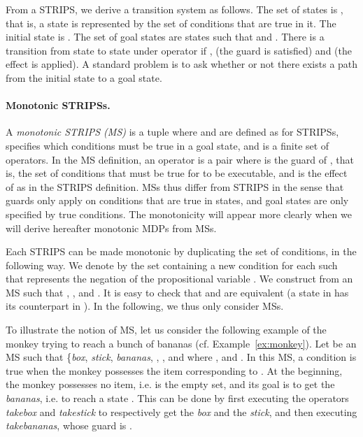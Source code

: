 \noindent From a STRIPS, we derive a transition system as follows. The set of states is , that is, a state is represented by the set of conditions that are true in it. The initial state is . The set of goal states are states  such that  and . There is a transition from state  to state  under operator  if ,  (the guard is satisfied) and  (the effect is applied). A standard problem is to ask whether or not there exists a path from the initial state to a goal state.

\paragraph{Monotonic STRIPSs.} 
A \textit{monotonic STRIPS (MS)} is a tuple  where  and  are defined as for STRIPSs,  specifies which conditions must be true in a goal state, and  is a finite set of operators. In the MS definition, an operator  is a pair  where  is the guard of , that is, the set of conditions that must be true for  to be executable, and  is the effect of  as in the STRIPS definition. 
MSs thus differ from STRIPS in the sense that guards only apply on conditions that are true in states, and goal states are only specified by true conditions. The monotonicity will appear more clearly when we will derive hereafter monotonic MDPs from MSs.

\noindent
Each STRIPS  can be made monotonic by duplicating the set of conditions, in the following way. We denote by  the set  containing a new condition  for each  such that  represents the negation of the propositional variable . We construct from  an MS  such that , ,  and . It is easy to check that  and  are equivalent (a state  in  has its counterpart  in ). In the following, we thus only consider MSs. 

\begin{example} \label{ex:ST}
To illustrate the notion of MS, let us consider the following example of the monkey trying to reach a bunch of bananas (cf. Example~\ref{ex:monkey}). Let  be an MS such that  \{\textit{box}, \textit{stick}, \textit{bananas}, , , and  where ,   and . In this MS, a condition  is true when the monkey possesses the item corresponding to . At the beginning, the monkey possesses no item, i.e.  is the empty set, and its goal is to get the \textit{bananas}, i.e. to reach a state . This can be done by first executing the operators \textit{takebox} and \textit{takestick} to respectively get the \textit{box} and the \textit{stick}, and then executing \textit{takebananas}, whose guard is .
\end{example}


